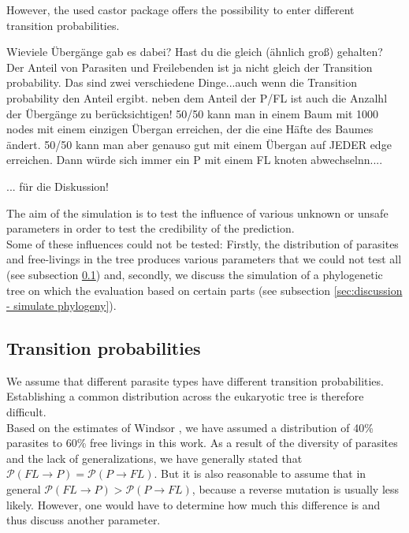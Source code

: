   However, the used castor package \cite{Louca2017} offers the possibility to enter different 
  transition probabilities.

  Wieviele Übergänge gab es dabei? Hast du die gleich (ähnlich groß) gehalten?
  Der Anteil von Parasiten und Freilebenden ist ja nicht gleich der Transition probability. Das sind zwei verschiedene Dinge...auch wenn die Transition probability den Anteil ergibt. 
  neben dem Anteil der P/FL ist auch die Anzalhl der Übergänge zu berücksichtigen!
  50/50 kann man in einem Baum mit 1000 nodes mit einem einzigen Übergan erreichen, der die eine Häfte des Baumes ändert.
  50/50 kann man aber genauso gut mit einem Übergan auf JEDER edge erreichen. Dann würde sich immer ein P mit einem FL knoten abwechselnn....

... für die Diskussion!

\todo{-----}

    The aim of the simulation is to test the influence of various unknown or unsafe parameters in 
      order to test the credibility of the prediction. \\
    Some of these influences could not be tested: Firstly, the distribution of parasites and 
      free-livings in the tree produces various parameters that we could not test all (see subsection 
      \ref{sec:discussion - transition probabilities}) and, secondly, we discuss the simulation of a 
      phylogenetic tree on which the evaluation based on certain parts (see subsection 
      \ref{sec:discussion - simulate phylogeny}).

    \subsection{Transition probabilities} \label{sec:discussion - transition probabilities}
      We assume that different parasite types have different transition probabilities. Establishing a 
        common distribution across the eukaryotic tree is therefore difficult. \\
      Based on the estimates of Windsor \cite{Windsor1998}, we have assumed a distribution of 40\% 
        parasites to 60\% free livings in this work. As a result of the diversity of parasites and the 
        lack of generalizations, we have generally stated that 
        $\mathcal{P}(FL \rightarrow P) = \mathcal{P}(P \rightarrow FL)$. But it is also reasonable to 
        assume that in general $\mathcal{P}(FL \rightarrow P) > \mathcal{P}(P \rightarrow FL)$, because 
        a reverse mutation is usually less likely. However, one would have to determine how much this 
        difference is and thus discuss another parameter. \\
      
